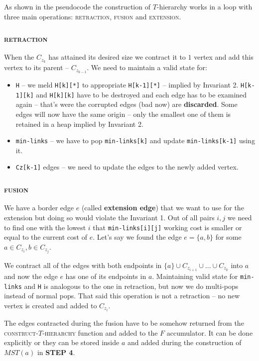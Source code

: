 As shown in the pseudocode the construction of $T$-hierarchy works in a loop with three main operations: \textsc{retraction}, \textsc{fusion} and \textsc{extension}.
\subsubsection{\textsc{retraction}}
When the $C_{z_k}$ has attained its desired size we contract it to $1$ vertex and add this vertex to its parent -- $C_{z_{k-1}}$. We need to maintain a valid state for:
\begin{itemize}
    \item \texttt{H} -- we meld \texttt{H[k][*]} to appropriate \texttt{H[k-1][*]} -- implied by Invariant 2. \texttt{H[k-1][k]} and \texttt{H[k][k]} have to be destroyed and each edge has to be examined again -- that's were the corrupted edges (bad now) are \textbf{discarded}. Some edges will now have the same origin -- only the smallest one of them is retained in a heap implied by Invariant 2.
    \item \texttt{min-links} -- we have to pop \texttt{min-links[k]} and update \texttt{min-links[k-1]} using it.
    \item \texttt{Cz[k-1]} edges -- we need to update the edges to the newly added vertex. 
\end{itemize}

\subsubsection{\textsc{fusion}}
We have a border edge $e$ (called \textbf{extension edge}) that we want to use for the extension but doing so would violate the Invariant 1. Out of all pairs $i,j$ we need to find one with the lowest $i$ that \texttt{min-links[i][j]} working cost is smaller or equal to the current cost of $e$. Let's say we found the edge $e = \{a,b\}$ for some $a \in C_{z_i}, b\in C_{z_j}$. 

We contract all of the edges with both endpoints in $\{a\} \cup C_{z_{i+1}}\cup ... \cup C_{z_k}$ into $a$ and now the edge $e$ has one of its endpoints in $a$. Maintaining valid state for \texttt{min-links} and \texttt{H} is analogous to the one in retraction, but now we do multi-pops instead of normal pops. That said this operation is not a retraction -- no new vertex is created and added to $C_{z_i}$.

\begin{remark}
    The edges contracted during the fusion have to be somehow returned from the \textsc{construct-$T$-hierarchy} function and added to the $F$ accumulator. It can be done explicitly or they can be stored inside $a$ and added during the construction of $MST(a)$ in \textbf{STEP 4}. 
\end{remark}

